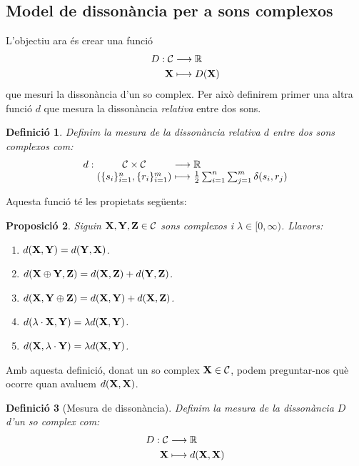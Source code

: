 \documentclass{article}
\theoremstyle{math}
\newtheorem{definition}{Definició}[section]
\newtheorem{prop}[definition]{Proposició}
\theoremstyle{TheoremNum}
\newcommand{\0}{\ensuremath{\vb{0}}}
\newcommand{\X}{\ensuremath{\vb{X}}}
\newcommand{\Y}{\ensuremath{\vb{Y}}}
\newcommand{\Z}{\ensuremath{\vb{Z}}}
\newcommand{\RR}{\ensuremath{\mathbb{R}}} %
\begin{document}
\subsection{Model de dissonància per a sons complexos}
\noindent L'objectiu ara és crear una funció 
\begin{align*}
    D:\mathcal{C}&\longrightarrow\RR\\
    \X&\longmapsto D(\X)
\end{align*}
que mesuri la dissonància d'un so complex. Per això definirem primer una altra funció $d$ que mesura la dissonància \textit{relativa} entre dos sons.
\begin{definition}
    Definim la \textit{mesura de la dissonància relativa $d$} entre dos sons complexos com:
    \begin{equation*}
        \begin{array}{r@{\hspace{0.5\tabcolsep}}c@{\hspace{0.5\tabcolsep}}c@{\hspace{0.5\tabcolsep}}l}
            d:&\mathcal{C}\times\mathcal{C}&\longrightarrow&\RR\\
        &(\{s_i\}_{i=1}^n,\{r_i\}_{i=1}^m)&\longmapsto&\frac{1}{2}\sum_{i=1}^n\sum_{j=1}^m\delta(s_i,r_j)
        \end{array}
    \end{equation*}
\end{definition}
\noindent Aquesta funció té les propietats següents:
\begin{prop}\label{prop_dem1}
    Siguin $\X,\Y,\Z\in\mathcal{C}$ sons complexos i $\lambda\in[0,\infty)$. Llavors:
    \begin{enumerate}[label=$d$\arabic*),ref=$d$\arabic*]
        \item\label{d1} $d(\X,\Y)=d(\Y,\X)$.
        \item\label{d2} $d(\X\oplus\Y,\Z)=d(\X,\Z)+d(\Y,\Z)$.
        \item\label{d3} $d(\X,\Y\oplus\Z)=d(\X,\Y)+d(\X,\Z)$.
        \item\label{d4} $d(\lambda\cdot\X,\Y)=\lambda d(\X,\Y)$.
        \item\label{d5} $d(\X,\lambda\cdot\Y)=\lambda d(\X,\Y)$.
    \end{enumerate}
\end{prop}
\noindent Amb aquesta definició, donat un so complex $\X\in\mathcal{C}$, podem preguntar-nos què ocorre quan avaluem $d(\X,\X)$.
\begin{definition}[Mesura de dissonància]
    Definim la \textit{mesura de la dissonància $D$ d'un so complex} com:
    \begin{align*}
        D:\mathcal{C}&\longrightarrow\RR\\
        \X&\longmapsto d(\X,\X)
    \end{align*}
\end{definition}
\end{document}
